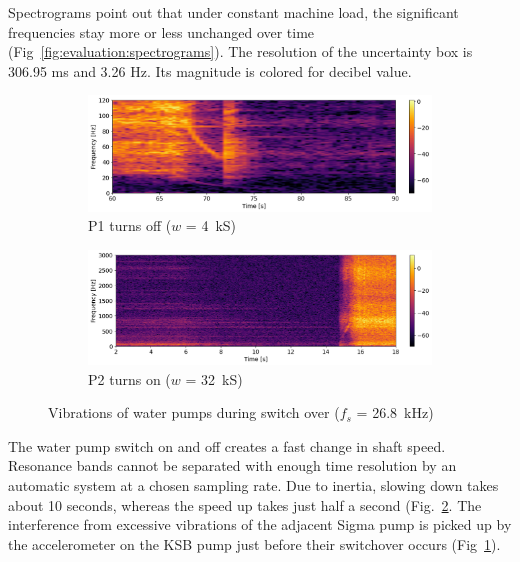 Spectrograms point out that under constant machine load, the significant frequencies stay more or less unchanged over time (Fig~\ref{fig:evaluation:spectrograms}). The resolution of the uncertainty box is 306.95 ms and 3.26 Hz. Its magnitude is colored for decibel value.

\begin{figure}[h]
    \centering
    \begin{subfigure}[b]{0.48\textwidth}
        \includegraphics[width=\textwidth]{assets/results/time-frequency-spectrum/P1-slow-down.png}
        \caption{P1 turns off ($w$ = 4~kS)}
    \end{subfigure}
    \hfill
    \begin{subfigure}[b]{0.48\textwidth}
        \includegraphics[width=\textwidth]{assets/results/time-frequency-spectrum/P2-speed-up.png}
        \caption{P2 turns on ($w$ = 32~kS)}
        \label{fig:evaluation-sigma-pump-interference}
    \end{subfigure}
    \caption{Vibrations of water pumps during switch over ($f_s$ = 26.8~kHz)}
    \label{fig:evaluation:pump-switch-over}
\end{figure}

The water pump switch on and off creates a fast change in shaft speed. Resonance bands cannot be separated with enough time resolution by an automatic system at a chosen sampling rate. Due to inertia, slowing down takes about 10 seconds, whereas the speed up takes just half a second (Fig.~\ref{fig:evaluation:pump-switch-over}. The interference from excessive vibrations of the adjacent Sigma pump is picked up by the accelerometer on the KSB pump just before their switchover occurs (Fig~\ref{fig:evaluation-sigma-pump-interference}).

